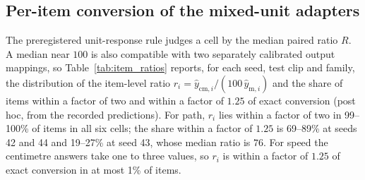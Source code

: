 \documentclass[11pt]{article}
\begin{document}


\subsection{Per-item conversion of the mixed-unit adapters}
\label{supp:item_ratios}

The preregistered unit-response rule judges a cell by the median paired
ratio $R$. A median near $100$ is also compatible with two separately
calibrated output mappings, so Table~\ref{tab:item_ratios} reports, for each
seed, test clip and family, the distribution of the item-level ratio
$r_i = \hat y_{\mathrm{cm},i}/(100\,\hat y_{\mathrm{m},i})$ and the share of
items within a factor of two and within a factor of $1.25$ of exact
conversion (post hoc, from the recorded predictions). For path, $r_i$ lies
within a factor of two in 99--100\% of items in all six cells; the share within
a factor of $1.25$ is 69--89\% at seeds 42 and 44 and 19--27\% at seed 43,
whose median ratio is $76$. For speed the centimetre answers take one to three
values, so $r_i$ is within a factor of $1.25$ of exact conversion in at most
1\% of items.






\end{document}
